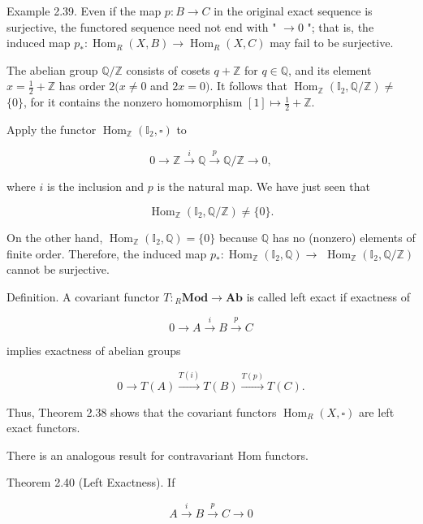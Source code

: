 \documentclass[10pt]{article}
\begin{document}
Example 2.39. Even if the map $p: B \rightarrow C$ in the original exact sequence is surjective, the functored sequence need not end with " $\rightarrow 0$ "; that is, the induced map $p_{*}: \operatorname{Hom}_{R}(X, B) \rightarrow \operatorname{Hom}_{R}(X, C)$ may fail to be surjective.

The abelian group $\mathbb{Q} / \mathbb{Z}$ consists of cosets $q+\mathbb{Z}$ for $q \in \mathbb{Q}$, and its element $x=\frac{1}{2}+\mathbb{Z}$ has order $2(x \neq 0$ and $2 x=0)$. It follows that $\operatorname{Hom}_{\mathbb{Z}}\left(\mathbb{I}_{2}, \mathbb{Q} / \mathbb{Z}\right) \neq$ $\{0\}$, for it contains the nonzero homomorphism $[1] \mapsto \frac{1}{2}+\mathbb{Z}$.

Apply the functor $\operatorname{Hom}_{\mathbb{Z}}\left(\mathbb{I}_{2}, \square\right)$ to

$$
0 \rightarrow \mathbb{Z} \xrightarrow{i} \mathbb{Q} \xrightarrow{p} \mathbb{Q} / \mathbb{Z} \rightarrow 0,
$$

where $i$ is the inclusion and $p$ is the natural map. We have just seen that

$$
\operatorname{Hom}_{\mathbb{Z}}\left(\mathbb{I}_{2}, \mathbb{Q} / \mathbb{Z}\right) \neq\{0\} .
$$

On the other hand, $\operatorname{Hom}_{\mathbb{Z}}\left(\mathbb{I}_{2}, \mathbb{Q}\right)=\{0\}$ because $\mathbb{Q}$ has no (nonzero) elements of finite order. Therefore, the induced map $p_{*}: \operatorname{Hom}_{\mathbb{Z}}\left(\mathbb{I}_{2}, \mathbb{Q}\right) \rightarrow$ $\operatorname{Hom}_{\mathbb{Z}}\left(\mathbb{I}_{2}, \mathbb{Q} / \mathbb{Z}\right)$ cannot be surjective.

Definition. A covariant functor $T:{ }_{R} \mathbf{M o d} \rightarrow \mathbf{A b}$ is called left exact if exactness of

$$
0 \rightarrow A \xrightarrow{i} B \xrightarrow{p} C
$$

implies exactness of abelian groups

$$
0 \rightarrow T(A) \xrightarrow{T(i)} T(B) \xrightarrow{T(p)} T(C) .
$$

Thus, Theorem 2.38 shows that the covariant functors $\operatorname{Hom}_{R}(X, \square)$ are left exact functors.

There is an analogous result for contravariant Hom functors.

Theorem 2.40 (Left Exactness). If

$$
A \xrightarrow{i} B \xrightarrow{p} C \rightarrow 0
$$
\end{document}
